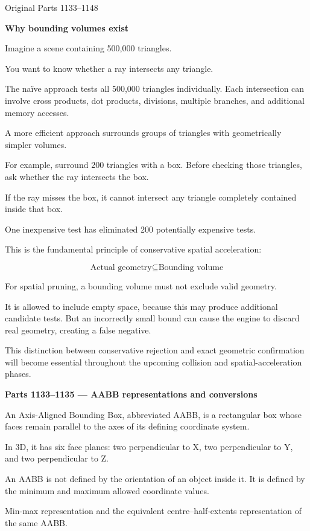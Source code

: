 Original Parts 1133--1148

\textbf{Why bounding volumes exist}

Imagine a scene containing 500,000 triangles.

You want to know whether a ray intersects any triangle.

The naïve approach tests all 500,000 triangles individually. Each intersection can involve cross products, dot products, divisions, multiple branches, and additional memory accesses.

A more efficient approach surrounds groups of triangles with geometrically simpler volumes.

For example, surround 200 triangles with a box. Before checking those triangles, ask whether the ray intersects the box.

If the ray misses the box, it cannot intersect any triangle completely contained inside that box.

One inexpensive test has eliminated 200 potentially expensive tests.

This is the fundamental principle of conservative spatial acceleration:

\[
\boxed{\text{Actual geometry}\subseteq\text{Bounding volume}}
\]

For spatial pruning, a bounding volume must not exclude valid geometry.

It is allowed to include empty space, because this may produce additional candidate tests. But an incorrectly small bound can cause the engine to discard real geometry, creating a false negative.

This distinction between conservative rejection and exact geometric confirmation will become essential throughout the upcoming collision and spatial-acceleration phases.

\textbf{Parts 1133--1135 --- AABB representations and conversions}

An Axis-Aligned Bounding Box, abbreviated AABB, is a rectangular box whose faces remain parallel to the axes of its defining coordinate system.

In 3D, it has six face planes: two perpendicular to X, two perpendicular to Y, and two perpendicular to Z.

An AABB is not defined by the orientation of an object inside it. It is defined by the minimum and maximum allowed coordinate values.

Min-max representation and the equivalent centre--half-extents representation of the same AABB.

